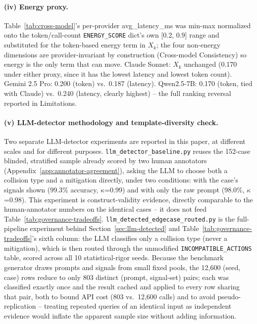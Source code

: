 \documentclass[letterpaper]{article} %
\begin{document}
\paragraph{(iv) Energy proxy.} Table~\ref{tab:cross-model}'s per-provider avg\_latency\_ms was min-max normalized onto the token/call-count \texttt{ENERGY\_SCORE} dict's own [0.2, 0.9] range and substituted for the token-based energy term in $X_k$; the four non-energy dimensions are provider-invariant by construction (Cross-model Consistency) so energy is the only term that can move. Claude Sonnet: $X_k$ unchanged (0.170 under either proxy, since it has the lowest latency and lowest token count). Gemini 2.5 Pro: 0.200 (token) vs.\ 0.187 (latency). Qwen2.5-7B: 0.170 (token, tied with Claude) vs.\ 0.240 (latency, clearly highest) -- the full ranking reversal reported in Limitations.

\paragraph{(v) LLM-detector methodology and template-diversity check.} Two separate LLM-detector experiments are reported in this paper, at different scales and for different purposes. \texttt{llm\_detector\_baseline.py} reuses the 152-case blinded, stratified sample already scored by two human annotators (Appendix~\ref{app:annotator-agreement}), asking the LLM to choose both a collision type and a mitigation directly, under two conditions: with the case's signals shown (99.3\% accuracy, $\kappa$=0.99) and with only the raw prompt (98.0\%, $\kappa$=0.98). This experiment is construct-validity evidence, directly comparable to the human-annotator numbers on the identical cases -- it does not feed Table~\ref{tab:governance-tradeoffs}. \texttt{llm\_detected\_edgecase\_routed.py} is the full-pipeline experiment behind Section~\ref{sec:llm-detected} and Table~\ref{tab:governance-tradeoffs}'s sixth column: the LLM classifies only a collision type (never a mitigation), which is then routed through the unmodified \texttt{INCOMPATIBLE\_ACTIONS} table, scored across all 10 statistical-rigor seeds. Because the benchmark generator draws prompts and signals from small fixed pools, the 12,600 (seed, case) rows reduce to only 803 distinct (prompt, signal-set) pairs; each was classified exactly once and the result cached and applied to every row sharing that pair, both to bound API cost (803 vs.\ 12,600 calls) and to avoid pseudo-replication -- treating repeated queries of an identical input as independent evidence would inflate the apparent sample size without adding information.
\end{document}

